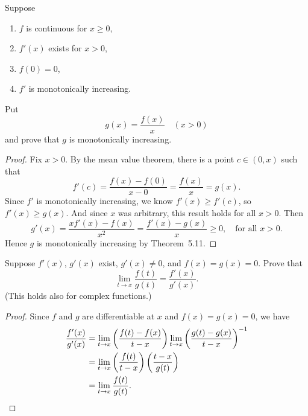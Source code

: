  Suppose
\begin{enumerate}
\item $f$ is continuous for $x\geq0$,
\item $f'(x)$ exists for $x > 0$,
\item $f(0) = 0$,
\item $f'$ is monotonically increasing.
\end{enumerate}
Put
\begin{equation*}
  g(x) = \frac{f(x)}x \quad(x > 0)
\end{equation*}
and prove that $g$ is monotonically increasing.
\begin{proof}
  Fix $x > 0$. By the mean value theorem, there is a point $c\in(0,x)$
  such that
  \begin{equation*}
    f'(c) = \frac{f(x) - f(0)}{x - 0} = \frac{f(x)}x = g(x).
  \end{equation*}
  Since $f'$ is monotonically increasing, we know $f'(x) \geq f'(c)$,
  so $f'(x) \geq g(x)$. And since $x$ was arbitrary, this result holds
  for all $x > 0$. Then
  \begin{equation*}
    g'(x) = \frac{xf'(x) - f(x)}{x^2}
    = \frac{f'(x) - g(x)}x
    \geq 0,
    \quad\text{for all $x > 0$}.
  \end{equation*}
  Hence $g$ is monotonically increasing by Theorem~5.11.
\end{proof}

 Suppose $f'(x)$, $g'(x)$ exist, $g'(x)\neq0$, and
$f(x) = g(x) = 0$. Prove that
\begin{equation*}
  \lim_{t\to x}\frac{f(t)}{g(t)} = \frac{f'(x)}{g'(x)}.
\end{equation*}
(This holds also for complex functions.)
\begin{proof}
  Since $f$ and $g$ are differentiable at $x$ and $f(x) = g(x) = 0$,
  we have
  \begin{align*}
    \frac{f'(x)}{g'(x)}
    &= \lim_{t\to x}\left(\frac{f(t) - f(x)}{t - x}\right)
      \lim_{t\to x}\left(\frac{g(t) - g(x)}{t - x}\right)^{-1} \\
    &= \lim_{t\to x}\left(\frac{f(t)}{t-x}\right)
      \left(\frac{t-x}{g(t)}\right) \\
    &= \lim_{t\to x}\frac{f(t)}{g(t)}. \qedhere
  \end{align*}
\end{proof}
